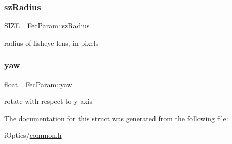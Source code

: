\subsubsection{\texorpdfstring{sz\+Radius}{szRadius}}
{\footnotesize\ttfamily S\+I\+ZE \+\_\+\+Fec\+Param\+::sz\+Radius}

radius of fisheye lens, in pixels \mbox{\label{struct___fec_param_a420253746bf3b988571baff716521f50}} 
\subsubsection{\texorpdfstring{yaw}{yaw}}
{\footnotesize\ttfamily float \+\_\+\+Fec\+Param\+::yaw}

rotate with respect to y-\/axis 

The documentation for this struct was generated from the following file\+:\begin{DoxyCompactItemize}
\item 
i\+Optics/\mbox{\hyperlink{common_8h}{common.\+h}}\end{DoxyCompactItemize}
